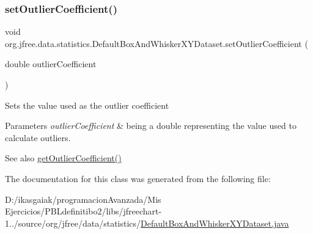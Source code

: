 \subsubsection{\texorpdfstring{set\+Outlier\+Coefficient()}{setOutlierCoefficient()}}
{\footnotesize\ttfamily void org.\+jfree.\+data.\+statistics.\+Default\+Box\+And\+Whisker\+X\+Y\+Dataset.\+set\+Outlier\+Coefficient (\begin{DoxyParamCaption}\item[{double}]{outlier\+Coefficient }\end{DoxyParamCaption})}

Sets the value used as the outlier coefficient


\begin{DoxyParams}{Parameters}
{\em outlier\+Coefficient} & being a {\ttfamily double} representing the value used to calculate outliers.\\
\hline
\end{DoxyParams}
\begin{DoxySeeAlso}{See also}
\mbox{\hyperlink{classorg_1_1jfree_1_1data_1_1statistics_1_1_default_box_and_whisker_x_y_dataset_ac47213bfcf3d3a0069a096077ea77531}{get\+Outlier\+Coefficient()}} 
\end{DoxySeeAlso}


The documentation for this class was generated from the following file\+:\begin{DoxyCompactItemize}
\item 
D\+:/ikasgaiak/programacion\+Avanzada/\+Mis Ejercicios/\+P\+B\+Ldefinitibo2/libs/jfreechart-\/1../source/org/jfree/data/statistics/\mbox{\hyperlink{_default_box_and_whisker_x_y_dataset_8java}{Default\+Box\+And\+Whisker\+X\+Y\+Dataset.\+java}}\end{DoxyCompactItemize}
